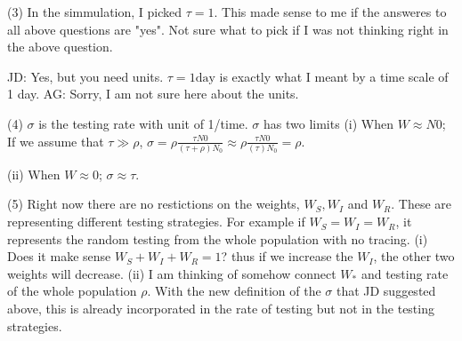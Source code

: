 (3) In the simmulation, I picked $\tau=1$. This made sense to me if the answeres to all above questions are "yes". Not sure what to pick if I was not thinking right in the above question.

JD: Yes, but you need units. $\tau = 1 \mathrm{day}$ is exactly what I meant by a time scale of 1 day. 
AG: Sorry, I am not sure here about the units.

(4) $\sigma$ is the testing rate with unit of 1/time. $\sigma$ has two limits
(i) When $W \approx N0$;
If we assume that $\tau \gg \rho$, $\sigma=\rho \frac{\tau N0}{(\tau+\rho)N_0} \approx \rho \frac{\tau N0}{(\tau)N_0} = \rho$. 

(ii) When $W \approx 0$;
$\sigma \approx \tau$.

(5) Right now there are no restictions on the weights, $W_S, W_I$ and $W_R$. These are representing different testing strategies. For example if $W_S=W_I=W_R$, it represents the random testing from the whole population with no tracing.
(i) Does it make sense $W_S+W_I+W_R=1$? thus if we increase the $W_I$, the other two weights will decrease.
(ii) I am thinking of somehow connect $W_*$ and testing rate of the whole population $\rho$. With the new definition of the $\sigma$ that JD suggested above, this is already incorporated in the rate of testing but not in the testing strategies. 

